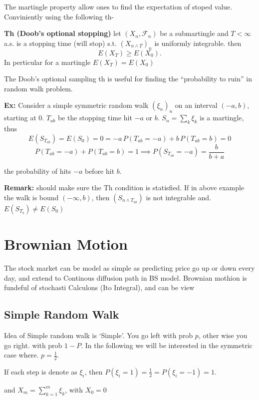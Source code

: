 \documentclass[
  letterpaper,
  DIV=11,
  numbers=noendperiod]{scrreprt}
\theoremstyle{definition}
\theoremstyle{plain}
\theoremstyle{plain}
\theoremstyle{definition}
\theoremstyle{plain}
\theoremstyle{plain}
\theoremstyle{remark}
\begin{document}
The martingle property allow ones to find the expectation of stoped
value. Conviniently using the following th-

\textbf{Th (Doob's optional stopping)} let \((X_n, \mathcal{F}_n)\) be a
submartingle and \(T < \infty\) a.s. is a stopping time (will stop) s.t.
\((X_{n \wedge T})_n\) is uniformly integrable. then \[
E(X_T) \geq E(X_0).
\] In perticular for a martingle \(E(X_T) = E(X_0)\)

The Doob's optional sampling th is useful for finding the ``probability
to ruin'' in random walk problem.

\textbf{Ex:} Consider a simple symmetric random walk \((\xi_n)_n\) on an
interval \((-a, b)\), starting at \(0\). \(T_{ab}\) be the stopping time
hit \(-a\) or \(b\). \(S_n = \sum_k \xi_k\) is a martingle, thus \[
E(S_{T_{ab}}) = E(S_0) = 0 = -a \, P(T_{ab} = -a) + b \, P(T_{ab} = b) = 0
\] \[
P(T_{ab} = -a) + P(T_{ab} = b) = 1 \implies P(S_{T_{ab}} = -a) = \frac{b}{b+a}
\]

the probability of hits \(-a\) before hit \(b\).

\textbf{Remark:} should make sure the Th condition is statisfied. If in
above example the walk is bound \((-\infty, b)\), then
\((S_{n \wedge T_{ab}})\) is not integrable and.
\(E(S_{T_b}) \neq E(S_0)\)

\chapter{Brownian Motion}\label{brownian-motion}

The stock market can be model as simple as predicting price go up or
down every day, and extend to Continous diffusion path in BS model.
Brownian mothion is fundeful of stochasti Calculons (Ito Integral), and
can be view

\section{Simple Random Walk}\label{simple-random-walk}

Idea of Simple random walk is `Simple'. You go left with prob \(p\),
other wise you go right. with prob \(1-P\). In the following we will be
interested in the symmetric case where. \(p = \tfrac12\).

If each step is denote as \(\xi_i\), then
\(P(\xi_i = 1) = \tfrac12 = P(\xi_i = -1) = 1\).

and \(X_m = \sum_{k=1}^{m} \xi_k\), with \(X_0 = 0\)
\end{document}
